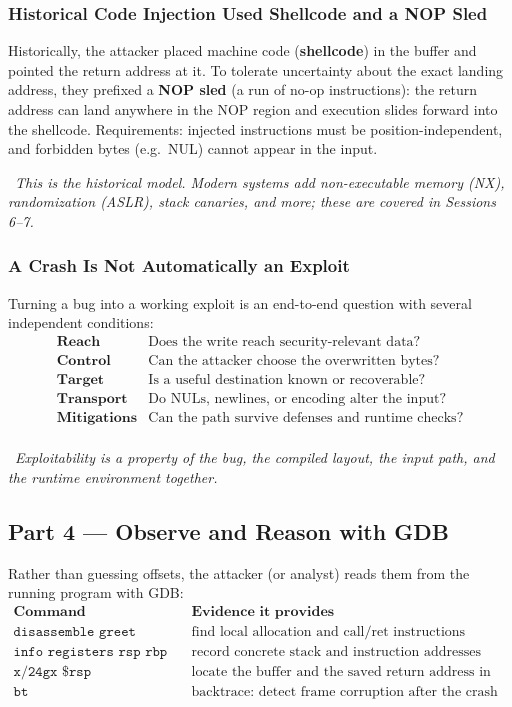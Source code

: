 \documentclass[hidelinks]{article}
\newcommand{\callout}[1]{\par\smallskip\noindent{\color{capri}$\blacktriangleright$}\ \textit{#1}\par\smallskip}
\begin{document}
\subsubsection{Historical Code Injection Used Shellcode and a NOP Sled}

Historically, the attacker placed machine code (\textbf{shellcode}) in the buffer and pointed the return address at it. To tolerate uncertainty about the exact landing address, they prefixed a \textbf{NOP sled} (a run of no-op instructions): the return address can land anywhere in the NOP region and execution slides forward into the shellcode. Requirements: injected instructions must be position-independent, and forbidden bytes (e.g.\ NUL) cannot appear in the input.

\callout{This is the \emph{historical} model. Modern systems add non-executable memory (NX), randomization (ASLR), stack canaries, and more; these are covered in Sessions 6--7.}

\subsubsection{A Crash Is Not Automatically an Exploit}

Turning a bug into a working exploit is an end-to-end question with several independent conditions:
\[
\begin{array}{ll}
\textbf{Reach} & \text{Does the write reach security-relevant data?}\\
\textbf{Control} & \text{Can the attacker choose the overwritten bytes?}\\
\textbf{Target} & \text{Is a useful destination known or recoverable?}\\
\textbf{Transport} & \text{Do NULs, newlines, or encoding alter the input?}\\
\textbf{Mitigations} & \text{Can the path survive defenses and runtime checks?}\\
\end{array}
\]

\callout{Exploitability is a property of the bug, the compiled layout, the input path, \emph{and} the runtime environment together.}

\subsection{Part 4 --- Observe and Reason with GDB}

Rather than guessing offsets, the attacker (or analyst) reads them from the running program with GDB:
\[
\begin{array}{ll}
\textbf{Command} & \textbf{Evidence it provides}\\ \hline
\texttt{disassemble greet} & \text{find local allocation and call/ret instructions}\\
\texttt{info registers rsp rbp rip} & \text{record concrete stack and instruction addresses}\\
\texttt{x/24gx \$rsp} & \text{locate the buffer and the saved return address in memory}\\
\texttt{bt} & \text{backtrace: detect frame corruption after the crash}\\
\end{array}
\]
\end{document}

